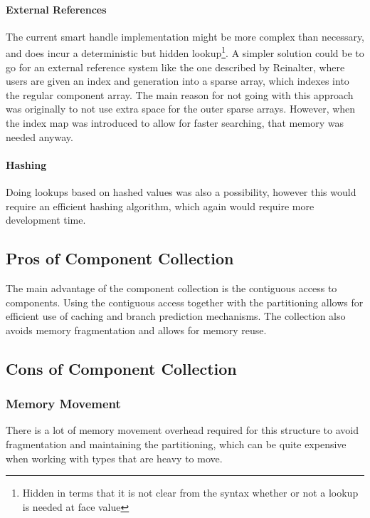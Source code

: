 \paragraph{External References}
\label{subpar:detailed_component_collection_external_references}
The current smart handle implementation might be more complex than necessary, and does incur a deterministic but hidden lookup\footnote{Hidden in terms that it is not clear from the syntax whether or not a lookup is needed at face value}.
A simpler solution could be to go for an external reference system like the one described by Reinalter\cite{molecular_matters_dod_external_references},
where users are given an index and generation into a sparse array, which indexes into the regular component array.
The main reason for not going with this approach was originally to not use extra space for the outer sparse arrays.
However, when the index map was introduced to allow for faster searching, that memory was needed anyway.

\paragraph{Hashing}
Doing lookups based on hashed values was also a possibility, however this would require an efficient hashing algorithm,
which again would require more development time.

\subsection{Pros of Component Collection}
The main advantage of the component collection is the contiguous access to components.
Using the contiguous access together with the partitioning allows for efficient use of caching and branch prediction mechanisms.
The collection also avoids memory fragmentation and allows for memory reuse.

\subsection{Cons of Component Collection}
\subsubsection{Memory Movement}
There is a lot of memory movement overhead required for this structure to avoid fragmentation and maintaining the partitioning, which can be quite expensive when working with types that are heavy to move.

